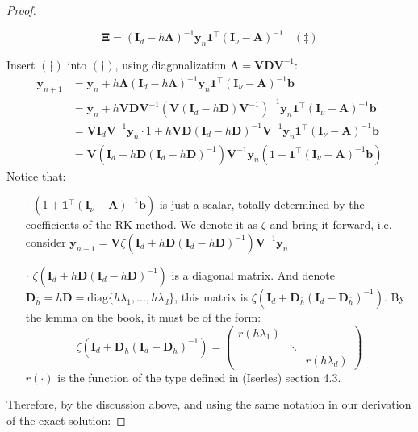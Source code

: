 \documentclass[a4paper, 10pt]{article}
\theoremstyle{definition}
\theoremstyle{hSol}
\begin{document}
\begin{proof}
\begin{itemize}
  $$
  \bm{\Xi} = (\bm{I}_d-h \bm{\Lambda})^{-1}\bm{y}_n \bm{1}^{\top} (\bm{I}_{\nu}-\bm{A})^{-1}~~~~(\ddagger)
  $$
\end{itemize}
Insert $(\ddagger)$ into $(\dag)$, using diagonalization $\bm{\Lambda}=\bm{V}\bm{D}\bm{V}^{-1}$:
\begin{equation}
  \begin{split}
    \bm{y}_{n+1} &= \bm{y}_n + h \bm{\Lambda} (\bm{I}_d-h \bm{\Lambda})^{-1}\bm{y}_n \bm{1}^{\top} (\bm{I}_{\nu}-\bm{A})^{-1} \bm{b} \\
    &= \bm{y}_n + h \bm{V}\bm{D}\bm{V}^{-1}\left(\bm{V}(\bm{I}_d- h\bm{D})\bm{V}^{-1}\right)^{-1} \bm{y}_n \bm{1}^{\top} (\bm{I}_{\nu}-\bm{A})^{-1} \bm{b}\\
    &= \bm{V}\bm{I}_d \bm{V}^{-1}\bm{y}_n\cdot 1 + h \bm{V}\bm{D}(\bm{I}_d- h\bm{D})^{-1}\bm{V}^{-1} \bm{y}_n \bm{1}^{\top} (\bm{I}_{\nu}-\bm{A})^{-1} \bm{b}\\
    &= \bm{V}(\bm{I}_d+h \bm{D} (\bm{I}_d-h \bm{D})^{-1}) \bm{V}^{-1}\bm{y}_n (1+\bm{1}^{\top} (\bm{I}_{\nu}-\bm{A})^{-1} \bm{b})
  \end{split}
\end{equation}
Notice that:
\begin{itemize}
   \item[$\cdot$] $(1+\bm{1}^{\top} (\bm{I}_{\nu}-\bm{A})^{-1} \bm{b})$ is just a scalar, totally determined by the coefficients of the RK method. We denote it as $\zeta$ and bring it forward, i.e. consider $\bm{y}_{n+1} = \bm{V}\zeta(\bm{I}_d+h \bm{D} (\bm{I}_d-h \bm{D})^{-1}) \bm{V}^{-1}\bm{y}_n$
   \item[$\cdot$] $\zeta(\bm{I}_d+h \bm{D} (\bm{I}_d-h \bm{D})^{-1})$ is a diagonal matrix. And denote $\bm{D}_{\bar{h}} = h \bm{D} = \text{diag}\{h\lambda_1, ..., h\lambda_{d}\}$, this matrix is $\zeta(\bm{I}_d+ \bm{D}_{\bar{h}} (\bm{I}_d-\bm{D}_{\bar{h}})^{-1})$. By the lemma on the book, it must be of the form:
   \begin{equation}
     \zeta(\bm{I}_d+ \bm{D}_{\bar{h}} (\bm{I}_d-\bm{D}_{\bar{h}})^{-1}) = \begin{pmatrix}
       r(h \lambda_1) \\
       & \ddots \\
       & & r(h \lambda_d)
     \end{pmatrix}
   \end{equation}
   $r(\cdot)$ is the function of the type defined in (Iserles) section 4.3.
 \end{itemize} 
Therefore, by the discussion above, and using the same notation in our derivation of the exact solution: 

\end{proof}
\end{document}
